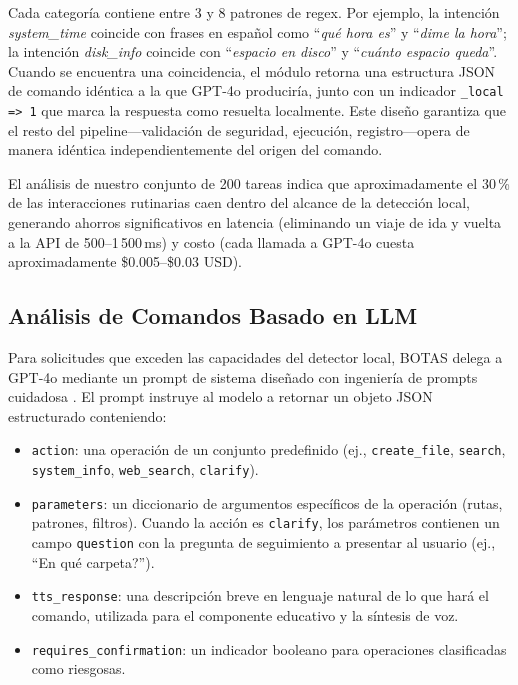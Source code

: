 \documentclass[10pt,a4paper]{article}
\begin{document}
Cada categor\'{i}a contiene entre 3 y 8 patrones de regex. Por ejemplo, la intenci\'{o}n \textit{system\_time} coincide con frases en espa\~{n}ol como ``\textit{qu\'{e} hora es}'' y ``\textit{dime la hora}''; la intenci\'{o}n \textit{disk\_info} coincide con ``\textit{espacio en disco}'' y ``\textit{cu\'{a}nto espacio queda}''. Cuando se encuentra una coincidencia, el m\'{o}dulo retorna una estructura JSON de comando id\'{e}ntica a la que GPT-4o producir\'{i}a, junto con un indicador \texttt{\_local => 1} que marca la respuesta como resuelta localmente. Este dise\~{n}o garantiza que el resto del pipeline---validaci\'{o}n de seguridad, ejecuci\'{o}n, registro---opera de manera id\'{e}ntica independientemente del origen del comando.

El an\'{a}lisis de nuestro conjunto de 200 tareas indica que aproximadamente el 30\,\% de las interacciones rutinarias caen dentro del alcance de la detecci\'{o}n local, generando ahorros significativos en latencia (eliminando un viaje de ida y vuelta a la API de 500--1\,500\,ms) y costo (cada llamada a GPT-4o cuesta aproximadamente \$0.005--\$0.03 USD).

\subsection{An\'{a}lisis de Comandos Basado en LLM}
\label{subsec:llm-parsing}

Para solicitudes que exceden las capacidades del detector local, BOTAS delega a GPT-4o mediante un prompt de sistema dise\~{n}ado con ingenier\'{i}a de prompts cuidadosa \citep{Wei2022}. El prompt instruye al modelo a retornar un objeto JSON estructurado conteniendo:

\begin{itemize}[noitemsep,topsep=0pt]
    \item \texttt{action}: una operaci\'{o}n de un conjunto predefinido (ej., \texttt{create\_file}, \texttt{search}, \texttt{system\_info}, \texttt{web\_search}, \texttt{clarify}).
    \item \texttt{parameters}: un diccionario de argumentos espec\'{i}ficos de la operaci\'{o}n (rutas, patrones, filtros). Cuando la acci\'{o}n es \texttt{clarify}, los par\'{a}metros contienen un campo \texttt{question} con la pregunta de seguimiento a presentar al usuario (ej., ``\textquestiondown En qu\'{e} carpeta?'').
    \item \texttt{tts\_response}: una descripci\'{o}n breve en lenguaje natural de lo que har\'{a} el comando, utilizada para el componente educativo y la s\'{i}ntesis de voz.
    \item \texttt{requires\_confirmation}: un indicador booleano para operaciones clasificadas como riesgosas.
\end{itemize}
\end{document}
